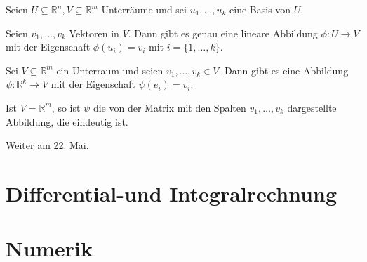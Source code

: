 \documentclass{mg2}
\begin{document}
\begin{satz}
Seien $U \subseteq \mathbb{R}^n, V \subseteq \mathbb{R}^m$ Unterräume und sei $u_1,\dots,u_k$ eine Basis von $U$.

Seien $v_1,\dots,v_k$ Vektoren in $V$. Dann gibt es genau eine lineare Abbildung $\phi: U \to V$ mit der Eigenschaft $\phi(u_i) = v_i$ mit $i = \{1,\dots,k\}$.
\end{satz}

\begin{beobachtung}
Sei $V \subseteq \mathbb{R}^m$ ein Unterraum und seien $v_1,\dots,v_k \in V$. Dann gibt es eine Abbildung $\psi: \mathbb{R}^k \to V$ mit der Eigenschaft $\psi(e_i) = v_i$.

Ist $V = \mathbb{R}^m$, so ist $\psi$ die von der Matrix mit den Spalten $v_1,\dots,v_k$ dargestellte Abbildung, die eindeutig ist.
\end{beobachtung}

Weiter am 22. Mai.
\section{Differential-und Integralrechnung}

\section{Numerik}
\end{document}
